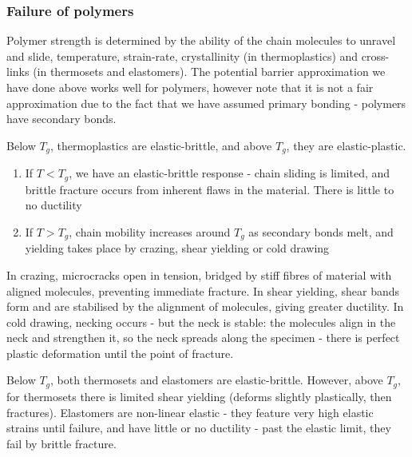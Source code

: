 \documentclass{article}
\begin{document}
\subsubsection{Failure of polymers}

Polymer strength is determined by the ability of the chain molecules to unravel and slide, temperature, strain-rate, crystallinity (in thermoplastics) and cross-links (in thermosets and elastomers). The potential barrier approximation we have done above works well for polymers, however note that it is not a fair approximation due to the fact that we have assumed primary bonding - polymers have secondary bonds.

\begin{proposition}
    Below $T_g$, thermoplastics are elastic-brittle, and above $T_g$, they are elastic-plastic.

    \begin{enumerate}
        \item If $T < T_g$, we have an elastic-brittle response - chain sliding is limited, and brittle fracture occurs from inherent flaws in the material. There is little to no ductility
        \item If $T > T_g$, chain mobility increases around $T_g$ as secondary bonds melt, and yielding takes place by crazing, shear yielding or cold drawing
    \end{enumerate}

    In crazing, microcracks open in tension, bridged by stiff fibres of material with aligned molecules, preventing immediate fracture. In shear yielding, shear bands form and are stabilised by the alignment of molecules, giving greater ductility. In cold drawing, necking occurs - but the neck is stable: the molecules align in the neck and strengthen it, so the neck spreads along the specimen - there is perfect plastic deformation until the point of fracture.
\end{proposition}

\begin{proposition}
    Below $T_g$, both thermosets and elastomers are elastic-brittle. However, above $T_g$, for thermosets there is limited shear yielding (deforms slightly plastically, then fractures). Elastomers are non-linear elastic - they feature very high elastic strains until failure, and have little or no ductility - past the elastic limit, they fail by brittle fracture.
\end{proposition}
\end{document}
